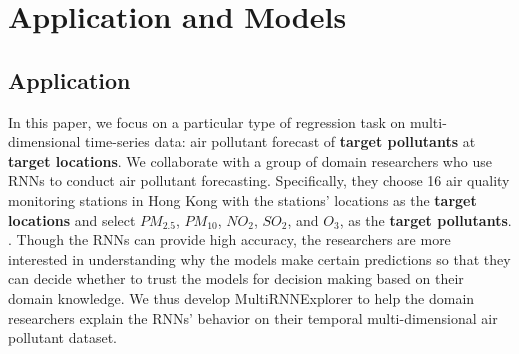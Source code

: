 \section{Application and Models}
\subsection{Application}
\label{section:application}
In this paper, we focus on a particular type of regression task on multi-dimensional time-series data: air pollutant forecast of \textbf{target pollutants} at \textbf{target locations}.
We collaborate with a group of domain researchers who use RNNs to conduct air pollutant forecasting.
Specifically, they choose 16 air quality monitoring stations in Hong Kong with the stations' locations as the \textbf{target locations} and select $PM_{2.5}$, $PM_{10}$, $NO_{2}$, $SO_{2}$, and $O_3$,  as the \textbf{target pollutants}. .
Though the RNNs can provide high accuracy, the researchers are more interested in understanding why the models make certain predictions so that they can decide whether to trust the models for decision making based on their domain knowledge.
We thus develop MultiRNNExplorer to help the domain researchers explain the RNNs' behavior on their temporal multi-dimensional air pollutant dataset.



